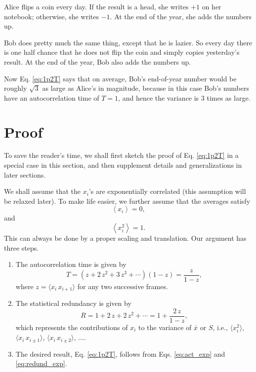 \documentclass[12pt]{article}
\begin{document}
Alice flips a coin every day.
%
If the result is a head, she writes $+1$ on her notebook;
otherwise, she writes $-1$.
%
At the end of the year, she adds the numbers up.

Bob does pretty much the same thing, except that he is lazier.
%
So every day there is one half chance that he does not flip the coin
and simply copies yesterday's result.
%
At the end of the year, Bob also adds the numbers up.

Now Eq. \eqref{eq:1p2T} says that on average,
Bob's end-of-year number would be roughly $\sqrt 3$
as large as Alice's in magnitude, because in this case
Bob's numbers have an autocorrelation time of $T = 1$,
and hence the variance is $3$ times as large.



\section{Proof}


To save the reader's time,
we shall first sketch the proof of Eq. \eqref{eq:1p2T}
in a special case in this section,
and then supplement details and generalizations
in later sections.

We shall assume that the $x_i$'s are exponentially correlated
(this assumption will be relaxed later).
%
To make life easier, we further assume that the averages satisfy
%
\begin{equation}
  \left\langle x_i \right\rangle = 0,
  \label{eq:ave_xi}
\end{equation}
%
and
%
\begin{equation}
  \left\langle x_i^2 \right\rangle = 1.
  \label{eq:var_xi}
\end{equation}
%
This can always be done by a proper scaling and translation.
%
Our argument has three steps.

\begin{enumerate}
\item
The autocorrelation time is given by
%
\begin{equation}
  T
  = (z + 2 \, z^2 + 3 \, z^3 + \cdots ) ( 1 - z )
  = \frac{ z } { 1 - z },
  \label{eq:act_exp}
\end{equation}
%
where $z = \langle x_i \, x_{i + 1} \rangle$
for any two successive frames.

\item
The statistical redundancy is given by
%
\begin{equation}
  R
  = 1 + 2 \, z + 2 \, z^2 + \cdots
  = 1 + \frac{ 2 \, z } { 1 - z },
  \label{eq:redund_exp}
\end{equation}
%
which represents
the contributions of $x_i$ to the variance of $\bar x$ or $S$, i.e.,
$\langle x_i^2 \rangle$,
$\langle x_i \, x_{i \pm 1} \rangle$,
$\langle x_i \, x_{i \pm 2} \rangle$, $\dots$.

\item
The desired result, Eq. \eqref{eq:1p2T},
follows from Eqs. \eqref{eq:act_exp} and \eqref{eq:redund_exp}.

\end{enumerate}
\end{document}
